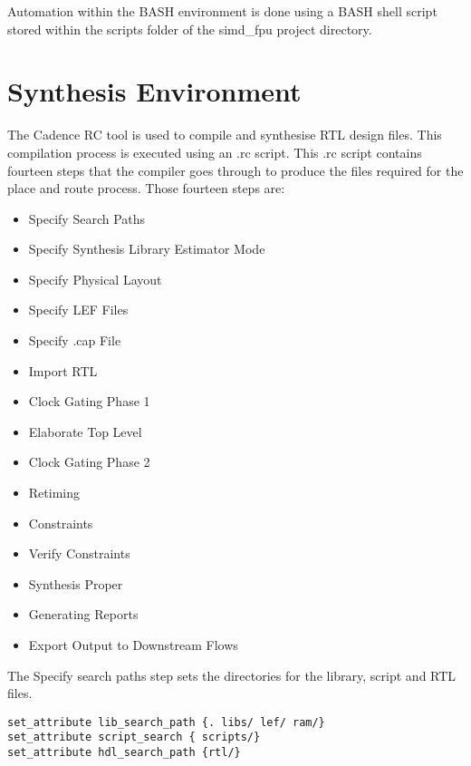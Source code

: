 \documentclass[conference]{IEEEtran}
\begin{document}
Automation within the BASH environment is done using a BASH shell script stored within the scripts folder of the simd\_fpu project directory.  
\section{Synthesis Environment}
The Cadence RC tool is used to compile and synthesise RTL design files. This compilation process is executed using an .rc script.  This .rc script contains fourteen steps that the compiler goes through to produce the files required for the place and route process. Those fourteen steps are:
\begin{itemize}
	\item Specify Search Paths
	\item Specify Synthesis Library Estimator Mode 
	\item Specify Physical Layout
	\item Specify LEF Files
	\item Specify .cap File
	\item Import RTL
	\item Clock Gating Phase 1
	\item Elaborate Top Level
	\item Clock Gating Phase 2
	\item Retiming
	\item Constraints
	\item Verify Constraints
	\item Synthesis Proper
	\item Generating Reports
	\item Export Output to Downstream Flows
\end{itemize} 
The Specify search paths step sets the directories for the library, script and RTL files.
\begin{framed}
\begin{lstlisting}
set_attribute lib_search_path {. libs/ lef/ ram/}
set_attribute script_search { scripts/}
set_attribute hdl_search_path {rtl/}
\end{lstlisting}
\end{framed}
\end{document}
